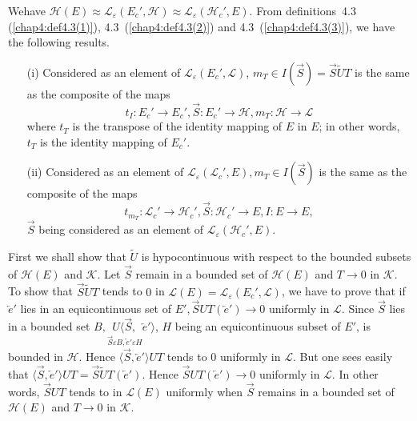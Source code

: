 We\pageoriginale have $\mathscr{H}(E)\approx \mathscr{L}_\varepsilon
(E_c', \mathscr{H})\approx \mathscr{L}_\varepsilon(\mathscr{H}_c',
E)$. From definitions~4.3 (\ref{chap4:def4.3(1)}), 4.3~(\ref{chap4:def4.3(2)}) 
and 4.3~(\ref{chap4:def4.3(3)}), we have the following results.
\begin{itemize}
\item [(i)] Considered as an element of $\mathscr{L}_\varepsilon
  (E_c', \mathscr{L})$, $m_T \in I (\overrightarrow{S}) =
  \overrightarrow{S}\tilde{U}T$ is the same as the composite of the
  maps
$$
t_I : E_c' \to E_c', \overrightarrow{S} : E_c' \to \mathscr{H}, m_T :
\mathscr{H} \to \mathscr{L}
$$
where $t_T$ is the transpose of the identity mapping of $E$ in $E$; in
other words, $t_T$ is the identity mapping of $E_c'$.
\item [(ii)] Considered as an element of $\mathscr{L}_\varepsilon
  (\mathscr{L}_c', E), m_T \in I (\overrightarrow{S})$ is the
  same as the composite of the maps
$$
t_{m_T} : \mathscr{L}_c' \to \mathscr{H}_c', \overrightarrow{S} :
\mathscr{H}_c' \to E, I : E \to E,
$$
$\overrightarrow{S}$ being considered as an element of
$\mathscr{L}_\varepsilon (\mathscr{H}_c', E)$. 
\end{itemize}

First we shall show that $\tilde{U}$ is hypocontinuous with respect to
the bounded subsets of $\mathscr{H}(E)$ and $\mathscr{K}$. Let
$\overrightarrow{S}$ remain in a bounded set of $\mathscr{H}(E)$ and
$T \to 0$ in $\mathscr{K}$. To show that $\overrightarrow{S} \tilde{U}
T$ tends to $0$ in $\mathscr{L} (E) = \mathscr{L}_\varepsilon (E_c',
\mathscr{L})$, we have to prove that if $\overleftarrow{e}'$ lies in
an equicontinuous set of $E', \overrightarrow{S} U T
(\overleftarrow{e}') \to 0$ uniformly in $\mathscr{L}$. Since
$\overrightarrow{S}$ lies in a bounded set $B,
\underset{\overrightarrow{S}\varepsilon B,
  \overleftarrow{e}'\varepsilon H}{U \langle
  \overrightarrow{S},}\overleftarrow{e}'\rangle$, $H$ being an
equicontinuous subset of $E'$, is bounded in $\mathscr{H}$. Hence
$\langle \overrightarrow{S}, \overleftarrow{e}'\rangle U T$ tends to
$0$ uniformly in $\mathscr{L}$. But one sees easily that $\langle
\overrightarrow{S}, \overleftarrow{e}'\rangle UT =
\overrightarrow{S}\tilde{U} T (\overleftarrow{e}')$. Hence
$\overrightarrow{S} U T (\overleftarrow{e}') \to 0$ uniformly in
$\mathscr{L}$. In other words, $\overrightarrow{S} U T$ tends to in
$\mathscr{L} (E)$ uniformly when $\overrightarrow{S}$ remains in a
bounded set of $\mathscr{H}(E)$ and $T \to 0$ in $\mathscr{K}$.

